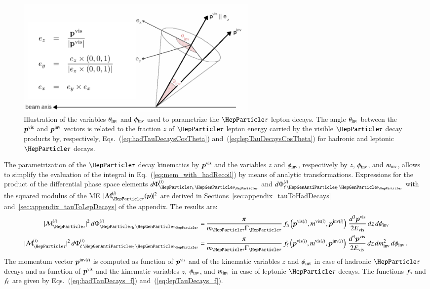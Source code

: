 \begin{figure}[h]
\begin{center}
\includegraphics*[height=58mm]{figures/tauDecayParametrization.pdf}
\end{center}
\caption{
  Illustration of the variables $\theta_{\textrm{inv}}$ and $\phi_{\textrm{inv}}$ used to parametrize the $\Pgt$ lepton decays.
  The angle $\theta_{\textrm{inv}}$ between the $\bm{p}^{\textrm{vis}}$ and $\bm{p}^{\textrm{inv}}$ vectors is related 
  to the fraction $z$ of $\Pgt$ lepton energy carried by the visible $\Pgt$ decay products
  by, respectively, Eqs.~(\ref{eq:hadTauDecaysCosTheta}) and~(\ref{eq:lepTauDecaysCosTheta}) for hadronic and leptonic $\Pgt$ decays.
}
\label{fig:tauDecayParametrization}
\end{figure} 

The parametrization of the $\Pgt$ decay kinematics by $\bm{p}^{\textrm{vis}}$
and the variables $z$ and $\phi_{\textrm{inv}}$, respectively by $z$, $\phi_{\textrm{inv}}$, and $m_{\textrm{inv}}$,
allows to simplify the evaluation of the integral in Eq.~(\ref{eq:mem_with_hadRecoil}) by means of analytic transformations.
Expressions for the product of the differential phase space elements
$d\Phi^{(i)}_{\tauhnu}$  and $d\Phi^{(i)}_{\ellnunu}$ with the squared
modulus of the ME $\vert \mathcal{M}^{(i)}_{\Pgt}(\bm{p}) \vert^{2}$ are derived in Sections~\ref{sec:appendix_tauToHadDecays} and~\ref{sec:appendix_tauToLepDecays} of the appendix.
The results are:
\begin{align}
\vert \mathcal{M}^{(i)}_{\Pgt} \vert^{2} \, d\Phi^{(i)}_{\tauhnu} 
 = & \, \frac{\pi}{m_{\Pgt}\Gamma_{\Pgt}} \,
 f_{\Phadron}\left(\bm{p}^{\vis(i)}, m^{\vis(i)},
   \bm{p}^{\inv(i)}\right) \, \frac{d^{3}\bm{p}^{\vis}}{2 E_{\vis}} \, dz \, d\phi_{\inv} \nonumber \\
\vert \mathcal{M}^{(i)}_{\Pgt} \vert^{2} \, d\Phi^{(i)}_{\ellnunu} 
 = & \, \frac{\pi}{m_{\Pgt}\Gamma_{\Pgt}} \, f_{\ell}\left(\bm{p}^{\vis(i)},
 m^{\vis(i)}, \bm{p}^{\inv(i)}\right) \, \frac{d^{3}\bm{p}^{\vis}}{2 E_{\vis}} \, dz \, dm^{2}_{\inv} \, d\phi_{\inv}
 \, .
\label{eq:PSint}
\end{align}
The momentum vector $\bm{p}^{\textrm{inv}(i)}$ is computed as function of
$\bm{p}^{\textrm{vis}}$ and of the kinematic variables $z$ and $\phi_{\textrm{inv}}$
in case of hadronic $\Pgt$ decays and as function of $\bm{p}^{\textrm{vis}}$
and the kinematic variables $z$, $\phi_{\textrm{inv}}$, and $m_{\textrm{inv}}$ in case
of leptonic $\Pgt$ decays.
The functions $f_{\textrm{h}}$ and $f_{\ell}$ are given by
Eqs.~(\ref{eq:hadTauDecays_f})
and~(\ref{eq:lepTauDecays_f}).

